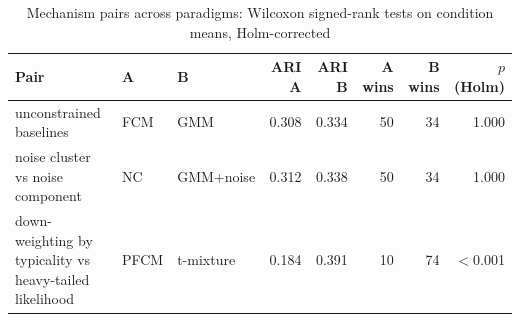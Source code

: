 \begin{table}[t]
\centering
\scriptsize
\setlength{\tabcolsep}{3pt}
\caption{Mechanism pairs across paradigms: Wilcoxon signed-rank tests on condition means, Holm-corrected}
\label{tab:pairs}
\begin{tabular}{lllrrrrr}
\toprule
Pair & A & B & ARI A & ARI B & A wins & B wins & $p$ (Holm) \\
\midrule
unconstrained baselines & FCM & GMM & 0.308 & 0.334 & 50 & 34 & 1.000 \\
noise cluster vs noise component & NC & GMM+noise & 0.312 & 0.338 & 50 & 34 & 1.000 \\
down-weighting by typicality vs heavy-tailed likelihood & PFCM & t-mixture & 0.184 & 0.391 & 10 & 74 & $<$0.001 \\
\bottomrule
\end{tabular}
\end{table}
